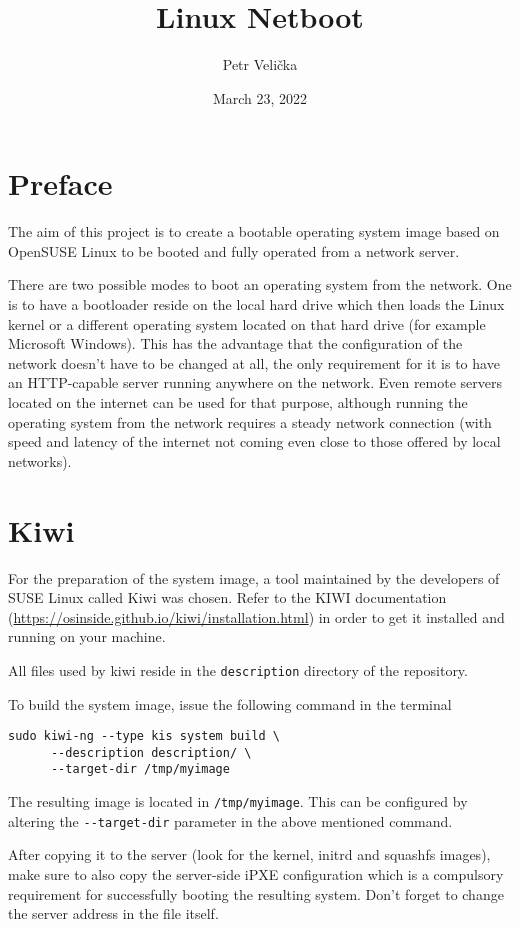 \documentclass{article}
\title{Linux Netboot}
\date{March 23, 2022}
\author{Petr Velička}
\begin{document}
\maketitle

\section{Preface}

The aim of this project is to create a bootable operating system image based on OpenSUSE Linux to be booted and fully operated from a network server.

There are two possible modes to boot an operating system from the network. One is to have a bootloader reside on the local hard drive which then loads the Linux kernel or a different operating system located on that hard drive (for example Microsoft Windows). This has the advantage that the configuration of the network doesn't have to be changed at all, the only requirement for it is to have an HTTP-capable server running anywhere on the network. Even remote servers located on the internet can be used for that purpose, although running the operating system from the network requires a steady network connection (with speed and latency of the internet not coming even close to those offered by local networks).

\section{Kiwi}

For the preparation of the system image, a tool maintained by the developers of SUSE Linux called Kiwi was chosen. Refer to the KIWI documentation (\url{https://osinside.github.io/kiwi/installation.html}) in order to get it installed and running on your machine.

All files used by kiwi reside in the \verb|description| directory of the repository. 

To build the system image, issue the following command in the terminal

\begin{verbatim}
sudo kiwi-ng --type kis system build \
      --description description/ \
      --target-dir /tmp/myimage
\end{verbatim}

The resulting image is located in \verb|/tmp/myimage|. This can be configured by altering the \verb|--target-dir| parameter in the above mentioned command.

After copying it to the server (look for the kernel, initrd and squashfs images), make sure to also copy the server-side iPXE configuration which is a compulsory requirement for successfully booting the resulting system. Don't forget to change the server address in the file itself.
\end{document}
